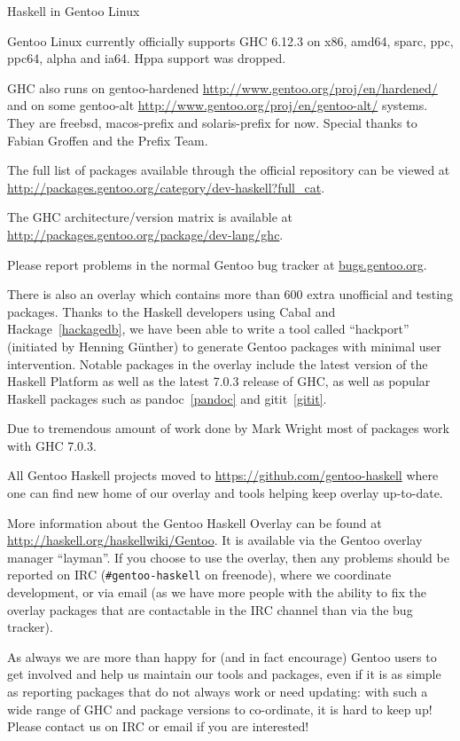 \begin{hcarentry}{Haskell in Gentoo Linux}
\label{gentoo}
\makeheader

Gentoo Linux currently officially supports GHC 6.12.3 on x86, amd64, sparc,
ppc, ppc64, alpha and ia64. Hppa support was dropped.

GHC also runs on gentoo-hardened \url{http://www.gentoo.org/proj/en/hardened/}
and on some gentoo-alt \url{http://www.gentoo.org/proj/en/gentoo-alt/}
systems. They are freebsd, macos-prefix and solaris-prefix for now.
Special thanks to Fabian Groffen and the Prefix Team.

The full list of packages available through the official repository
can be viewed at
\url{http://packages.gentoo.org/category/dev-haskell?full\_cat}.

The GHC architecture/version matrix is available at
\url{http://packages.gentoo.org/package/dev-lang/ghc}.

Please report problems in the normal Gentoo bug tracker
at \url{bugs.gentoo.org}.

There is also an overlay which contains more than 600 extra unofficial
and testing packages. Thanks to the Haskell developers using Cabal and
Hackage~\cref{hackagedb}, we have been able to write a tool called
``hackport'' (initiated by Henning G\"unther) to generate Gentoo
packages with minimal user intervention. Notable packages in the
overlay include the latest version of the Haskell Platform as well as
the latest 7.0.3 release of GHC, as well as popular Haskell packages
such as pandoc~\cref{pandoc} and gitit~\cref{gitit}.

Due to tremendous amount of work done by Mark Wright most of packages
work with GHC 7.0.3.

All Gentoo Haskell projects moved to \url{https://github.com/gentoo-haskell}
where one can find new home of our overlay and tools helping keep overlay
up-to-date.

More information about the Gentoo Haskell Overlay can be found at
\url{http://haskell.org/haskellwiki/Gentoo}. It is available via the Gentoo
overlay manager ``layman''.  If you choose to use the overlay, then
any problems should be reported on IRC (\verb+#gentoo-haskell+ on
freenode), where we coordinate development, or via email
 (as we have more people with the ability to
fix the overlay packages that are contactable in the IRC channel than
via the bug tracker).

As always we are more than happy for (and in fact encourage) Gentoo
users to get involved and help us maintain our tools and packages,
even if it is as simple as reporting packages that do not always work
or need updating: with such a wide range of GHC and package versions
to co-ordinate, it is hard to keep up!  Please contact us on IRC or
email if you are interested!
\end{hcarentry}

